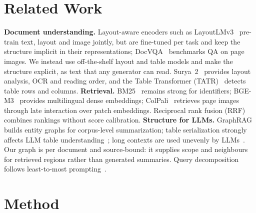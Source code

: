\documentclass[runningheads]{llncs}
\begin{document}
\section{Related Work}
\textbf{Document understanding.} Layout-aware encoders such as LayoutLMv3~\cite{huang2022layoutlmv3} pre-train text, layout and image jointly, but are fine-tuned per task and keep the structure implicit in their representations; DocVQA~\cite{mathew2021docvqa} benchmarks QA on page images. We instead use off-the-shelf layout and table models and make the structure explicit, as text that any generator can read. Surya~2~\cite{paruchuri2026surya2} provides layout analysis, OCR and reading order, and the Table Transformer (TATR)~\cite{smock2022pubtables} detects table rows and columns.
\textbf{Retrieval.} BM25~\cite{robertson2009bm25} remains strong for identifiers; BGE-M3~\cite{chen2024bgem3} provides multilingual dense embeddings; ColPali~\cite{faysse2025colpali} retrieves page images through late interaction over patch embeddings. Reciprocal rank fusion (RRF)~\cite{cormack2009rrf} combines rankings without score calibration.
\textbf{Structure for LLMs.} GraphRAG~\cite{edge2024graphrag} builds entity graphs for corpus-level summarization; table serialization strongly affects LLM table understanding~\cite{sui2024table}; long contexts are used unevenly by LLMs~\cite{liu2024lost}. Our graph is per document and source-bound: it supplies scope and neighbours for retrieved regions rather than generated summaries. Query decomposition follows least-to-most prompting~\cite{zhou2023leasttomost}.

\section{Method}
\end{document}
